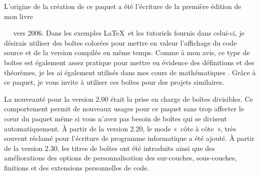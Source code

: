 L'origine de la création de ce paquet a été l'écriture de la première édition de mon livre
\flqq~{~\frqq~\cite{sturm:latex} vers 2006.
Dans les exemples \LaTeX\ et les tutoriels fournis dans celui-ci, je désirais utiliser des
boîtes colorées pour mettre en valeur l'affichage du code source et de la version
compilée en même temps. Comme à mon avis, ce type de boîtes est également
assez pratique pour mettre en évidence des définitions et des théorèmes, je les ai
également  utilisés dans mes cours de mathématiques
\cite{sturm:mathe1,sturm:mathe2,sturm:mathe3}.
Grâce à ce paquet, je vous invite à utiliser ces boîtes pour des projets similaires.


La nouveauté pour la version 2.00 était la prise en charge de boîtes divisibles.
Ce comportement permit de nouveaux usages pour ce paquet sans trop affecter
le cœur du paquet même si vous n'avez pas besoin de boîtes qui se divisent automatiquement.
À partir de la version 2.20, le mode «~côte à côte~», très souvent réclamé pour l'écriture de
programme informatique a été ajouté.
À partir de la version 2.30, les titres de boîtes ont été introduits ainsi que des
améliorations des options de personnalisation des sur-couches, sous-couches, finitions et
des extensions personnelles de code.



}
